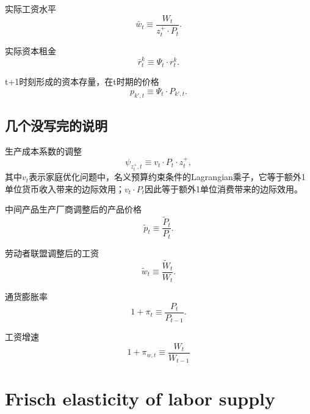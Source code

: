 \begin{subappendices}
实际工资水平
\begin{equation}
  \label{eq:scaled-real-wage}
  \bar{w}_t \equiv \frac{W_t}{z_t^+ \cdot P_t}.
\end{equation}

实际资本租金
\begin{equation}
  \label{eq:real-rental-rate-capital}
  \bar{r}_t^k \equiv \Psi_t \cdot r_t^k.
\end{equation}

t+1时刻形成的资本存量，在t时期的价格
\begin{equation}
  \label{eq:scaled-physical-capital-price}
  p_{k',t} \equiv \Psi_t \cdot P_{k',t}.
\end{equation}

\subsection{几个没写完的说明}

生产成本系数的调整
\begin{equation}
  \label{eq:scaled-produc-cost-adj-coef}
  \psi_{z_t^+, t} \equiv v_t \cdot P_t \cdot z_t^+,
\end{equation}
其中$v_t$表示家庭优化问题中，名义预算约束条件的Lagrangian乘子，它等于额外1单位货币收入带来的边际效用；$v_t \cdot P_t$因此等于额外1单位消费带来的边际效用。

中间产品生产厂商调整后的产品价格
\begin{equation}
  \label{eq:scaled-intm-good-price}
  \tilde{p}_t \equiv \frac{\tilde{P}_t}{P_t}.
\end{equation}

劳动者联盟调整后的工资
\begin{equation}
  \label{eq:scaled-labor-union-price}
  \tilde{w}_t \equiv \frac{\tilde{W}_t}{W_t}.
\end{equation}

通货膨胀率
\begin{equation}
  \label{eq:scaled-price-inflation}
  1+\pi_t \equiv \frac{P_t}{P_{t-1}}.
\end{equation}

工资增速
\begin{equation}
  \label{eq:scaled-wage-inflation}
  1+\pi_{w,t} \equiv \frac{W_t}{W_{t-1}}
\end{equation}


\section{Frisch elasticity of labor supply}
\label{sec:Frish-elasticity}

\end{subappendices}
